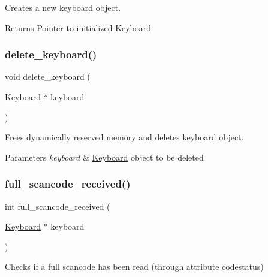 Creates a new keyboard \textquotesingle{}object\textquotesingle{}. 

\begin{DoxyReturn}{Returns}
Pointer to initialized \hyperlink{struct_keyboard}{Keyboard} 
\end{DoxyReturn}
\hypertarget{group__keyboard_ga8cbe117a33793a5f88056d37164af0a8}{}\label{group__keyboard_ga8cbe117a33793a5f88056d37164af0a8} 
\subsubsection{\texorpdfstring{delete\+\_\+keyboard()}{delete\_keyboard()}}
{\footnotesize\ttfamily void delete\+\_\+keyboard (\begin{DoxyParamCaption}\item[{\hyperlink{struct_keyboard}{Keyboard} $\ast$}]{keyboard }\end{DoxyParamCaption})}



Frees dynamically reserved memory and deletes keyboard \textquotesingle{}object\textquotesingle{}. 


\begin{DoxyParams}{Parameters}
{\em keyboard} & \hyperlink{struct_keyboard}{Keyboard} \textquotesingle{}object\textquotesingle{} to be deleted \\
\hline
\end{DoxyParams}
\hypertarget{group__keyboard_gacd892a0b56fcd859cc2ed0bc17e32d7f}{}\label{group__keyboard_gacd892a0b56fcd859cc2ed0bc17e32d7f} 
\subsubsection{\texorpdfstring{full\+\_\+scancode\+\_\+received()}{full\_scancode\_received()}}
{\footnotesize\ttfamily int full\+\_\+scancode\+\_\+received (\begin{DoxyParamCaption}\item[{\hyperlink{struct_keyboard}{Keyboard} $\ast$}]{keyboard }\end{DoxyParamCaption})}



Checks if a full scancode has been read (through attribute codestatus) 


